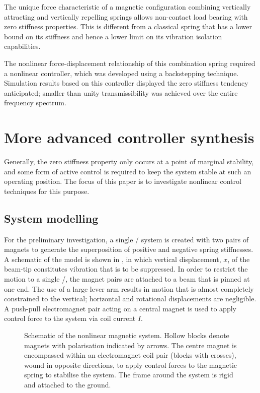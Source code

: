 The unique force characteristic of a magnetic configuration
combining vertically attracting and vertically repelling springs
allows non-contact load bearing with zero stiffness properties. This
is different from a classical spring that has a lower bound on its
stiffness and hence a lower limit on its vibration isolation
capabilities.

The nonlinear force-displacement relationship of this combination
spring required a nonlinear controller, which was developed using a
backstepping technique. Simulation results based on this controller
displayed the zero stiffness tendency anticipated; smaller than
unity transmissibility was achieved over the entire frequency
spectrum.





\section{More advanced controller synthesis}


Generally, the zero stiffness property only occurs at a point of
marginal stability, and some form of active control is required to
keep the system stable at such an operating position.  The focus of
this paper is to investigate nonlinear control techniques for this
purpose.

\subsection{System modelling}

For the preliminary investigation, a single \dof/ system
is created with two pairs of magnets to generate the superposition of
positive and negative spring stiffnesses. A schematic of the model is
shown in , in which vertical displacement, $x$, of
the beam-tip constitutes vibration that is to be suppressed. In order
to restrict the motion to a single \dof/, the magnet pairs
are attached to a beam that is pinned at one end. The use of a large
lever arm results in motion that is almost completely constrained to
the vertical; horizontal and rotational displacements are
negligible. A push-pull electromagnet pair acting on a central magnet
is used to apply control force to the system via coil current $I$.

\begin{figure}
  \centering
  \caption{Schematic of the nonlinear magnetic system. Hollow blocks
    denote magnets with polarisation indicated by arrows. The centre
    magnet is encompassed within an electromagnet coil pair (blocks
    with crosses), wound in opposite directions, to apply control
    forces to the magnetic spring to stabilise the system. The frame
    around the system is rigid and attached to the ground.}
\end{figure}

